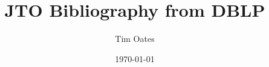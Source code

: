 \documentclass[12pt]{article}
\title{ JTO Bibliography from DBLP}
\author{ Tim Oates }
\date{\today}
\begin{document}
\maketitle

\nocite{*}


%

\end{document}
